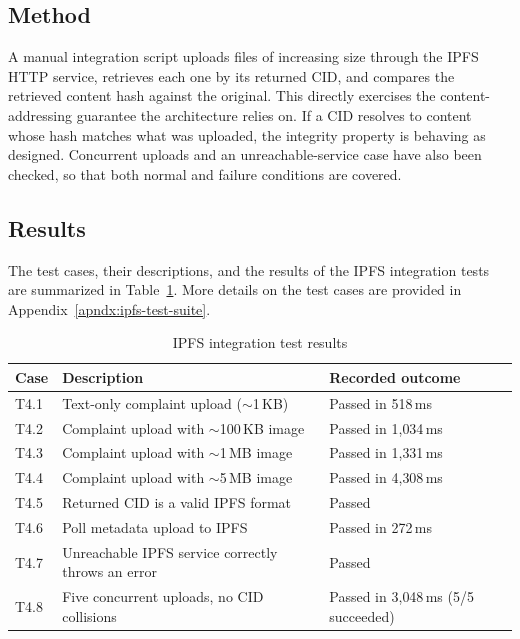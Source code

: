 \subsection{Method}

A manual integration script uploads files of increasing size through the IPFS HTTP service, retrieves each one by its returned CID, and compares the retrieved content hash against the original. This directly exercises the content-addressing guarantee the architecture relies on. If a CID resolves to content whose hash matches what was uploaded, the integrity property is behaving as designed. Concurrent uploads and an unreachable-service case have also been checked, so that both normal and failure conditions are covered.

\subsection{Results}

The test cases, their descriptions, and the results of the IPFS integration tests are summarized in Table~\ref{tab:ipfs-results}. More details on the test cases are provided in Appendix~\ref{apndx:ipfs-test-suite}.

\begin{table}[htbp]
\centering
\caption{IPFS integration test results}
\label{tab:ipfs-results}
\begin{tabular}{p{}|p{}|p{}}
    
    Case & Description & Recorded outcome \\
    \hline
    T4.1 & Text-only complaint upload ($\sim$1\,KB) & Passed in 518\,ms \\
    \hline
    T4.2 & Complaint upload with $\sim$100\,KB image & Passed in 1{,}034\,ms \\
    \hline
    T4.3 & Complaint upload with $\sim$1\,MB image & Passed in 1{,}331\,ms \\
    \hline
    T4.4 & Complaint upload with $\sim$5\,MB image & Passed in 4{,}308\,ms \\
    \hline
    T4.5 & Returned CID is a valid IPFS format & Passed \\
    \hline
    T4.6 & Poll metadata upload to IPFS & Passed in 272\,ms \\
    \hline
    T4.7 & Unreachable IPFS service correctly throws an error & Passed \\
    \hline
    T4.8 & Five concurrent uploads, no CID collisions & Passed in 3{,}048\,ms (5/5 succeeded) \\
    
\end{tabular}
\end{table}

